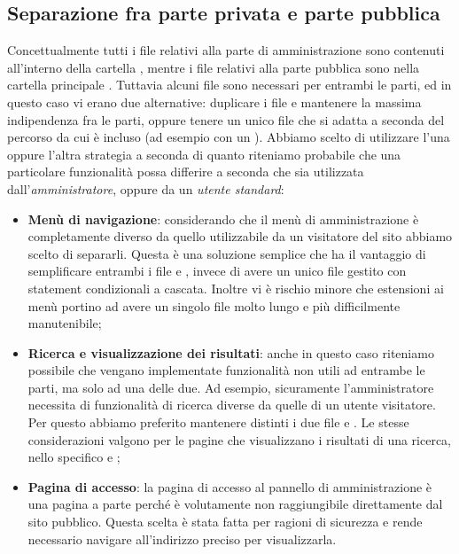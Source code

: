 \documentclass[12pt]{article}
\begin{document}
	\subsection{Separazione fra parte privata e parte pubblica}
	Concettualmente tutti i file relativi alla parte di amministrazione sono contenuti all'interno della cartella , mentre i file relativi alla parte pubblica sono nella cartella principale . 
	Tuttavia alcuni file sono necessari per entrambi le parti, ed in questo caso vi erano due alternative: duplicare i file e mantenere la massima indipendenza fra le parti, oppure tenere un unico file che si adatta a seconda del percorso da cui è incluso (ad esempio con un ). Abbiamo scelto di utilizzare l'una oppure l'altra strategia a seconda di quanto riteniamo probabile che una particolare funzionalità possa differire a seconda che sia utilizzata dall'\textit{amministratore}, oppure da un \textit{utente standard}: 
	\begin{itemize}
		\item \textbf{Menù di navigazione}: considerando che il menù di amministrazione è completamente diverso da quello utilizzabile da un visitatore del sito abbiamo scelto di separarli. Questa è una soluzione semplice che ha il vantaggio di semplificare entrambi i file  e , invece di avere un unico file gestito con statement condizionali a cascata. Inoltre vi è rischio minore che estensioni ai menù portino ad avere un singolo file molto lungo e più difficilmente manutenibile;
		\item \textbf{Ricerca e visualizzazione dei risultati}: anche in questo caso riteniamo possibile che vengano implementate funzionalità non utili ad entrambe le parti, ma solo ad una delle due. Ad esempio, sicuramente l'amministratore necessita di funzionalità di ricerca diverse da quelle di un utente visitatore. Per questo abbiamo preferito mantenere distinti i due file  e . Le stesse considerazioni valgono per le pagine che visualizzano i risultati di una ricerca, nello specifico  e ;
		\item \textbf{Pagina di accesso}: la pagina di accesso al pannello di amministrazione è una pagina a parte perché è volutamente non raggiungibile direttamente dal sito pubblico. Questa scelta è stata fatta per ragioni di sicurezza e rende necessario navigare all'indirizzo preciso per visualizzarla.
	\end{itemize}
	
\end{document}
